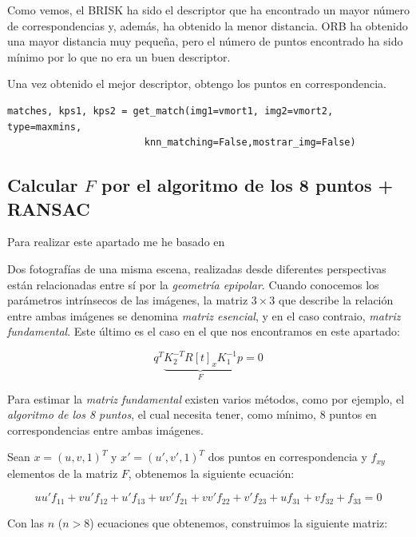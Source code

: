 \documentclass[11pt,a4paper]{article}
\theoremstyle{plain}
\theoremstyle{definition}
\begin{document}
Como vemos, el BRISK ha sido el descriptor que ha encontrado un mayor número de correspondencias y, además, ha obtenido la menor distancia. ORB ha obtenido una mayor distancia muy pequeña, pero el número de puntos encontrado ha sido mínimo por lo que no era un buen descriptor.

Una vez obtenido el mejor descriptor, obtengo los puntos en correspondencia.

\begin{verbatim}
matches, kps1, kps2 = get_match(img1=vmort1, img2=vmort2, type=maxmins, 
                        knn_matching=False,mostrar_img=False)
\end{verbatim}

\subsection{Calcular $F$ por el algoritmo de los 8 puntos + RANSAC}

Para realizar este apartado me he basado en \cite{epi}

Dos fotografías de una misma escena, realizadas desde diferentes perspectivas están relacionadas entre sí por la \textit{geometría epipolar}. Cuando conocemos los parámetros intrínsecos de las imágenes, la matriz $3 \times 3$ que describe la relación entre ambas imágenes se denomina \textit{matriz esencial}, y en el caso contraio, \textit{matriz fundamental}. Este último es el caso en el que nos encontramos en este apartado:

\begin{displaymath}
q^T \underbrace{K_2^{-T} R[t]_x K_1^{-1}}_F p = 0
\end{displaymath}

Para estimar la \textit{matriz fundamental} existen varios métodos, como por ejemplo, el \textit{algoritmo de los 8 puntos}, el cual necesita tener, como mínimo, 8 puntos en correspondencias entre ambas imágenes. 

Sean $x = (u,v,1)^T$ y $x' = (u',v',1)^T$ dos puntos en correspondencia y $f_{xy}$ elementos de la matriz $F$, obtenemos la siguiente ecuación:

\begin{displaymath}
uu'f_{11} + vu'f_{12} + u'f_{13} + uv'f_{21} + vv'f_{22} + v'f_{23} + uf_{31} + vf_{32} + f_{33} = 0
\end{displaymath}

Con las $n$ ($n > 8$) ecuaciones que obtenemos, construimos la siguiente matriz:
\end{document}
